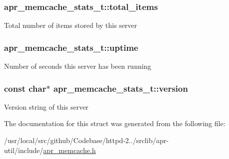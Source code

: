 \subsubsection[{\texorpdfstring{total\+\_\+items}{total_items}}]{ apr\+\_\+memcache\+\_\+stats\+\_\+t\+::total\+\_\+items}\hypertarget{structapr__memcache__stats__t_a298fd199bee38cd658d54f6099e9fb58}{}\label{structapr__memcache__stats__t_a298fd199bee38cd658d54f6099e9fb58}
Total number of items stored by this server 
\subsubsection[{\texorpdfstring{uptime}{uptime}}]{ apr\+\_\+memcache\+\_\+stats\+\_\+t\+::uptime}\hypertarget{structapr__memcache__stats__t_aec6db8440a51aabfbfaf2130ec5a78bb}{}\label{structapr__memcache__stats__t_aec6db8440a51aabfbfaf2130ec5a78bb}
Number of seconds this server has been running 
\subsubsection[{\texorpdfstring{version}{version}}]{\setlength{\rightskip}{0pt plus 5cm}const char$\ast$ apr\+\_\+memcache\+\_\+stats\+\_\+t\+::version}\hypertarget{structapr__memcache__stats__t_a5fa17a72064c6b5ae0624f5945fceea7}{}\label{structapr__memcache__stats__t_a5fa17a72064c6b5ae0624f5945fceea7}
Version string of this server 

The documentation for this struct was generated from the following file\+:\begin{DoxyCompactItemize}
\item 
/usr/local/src/github/\+Codebase/httpd-\/2../srclib/apr-\/util/include/\hyperlink{apr__memcache_8h}{apr\+\_\+memcache.\+h}\end{DoxyCompactItemize}

